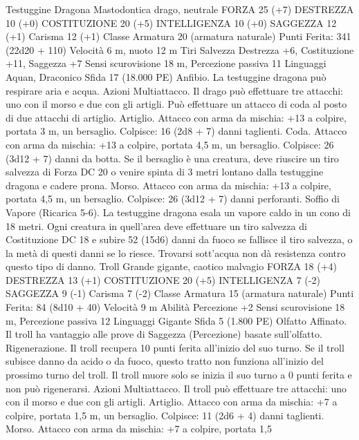 \begin{multicols}{2}
Testuggine Dragona
Mastodontica drago, neutrale
FORZA 25 (+7)
DESTREZZA 10 (+0)
COSTITUZIONE 20 (+5)
INTELLIGENZA 10 (+0)
SAGGEZZA 12 (+1)
Carisma 12 (+1)
Classe Armatura 20 (armatura naturale)
\hspace*{0pt}\hfill{Punti Ferita}: 341 (22d20 + 110)
Velocità 6 m, nuoto 12 m
Tiri Salvezza Destrezza +6, Costituzione +11, Saggezza +7
Sensi scurovisione 18 m, Percezione passiva 11
Linguaggi Aquan, Draconico
Sfida 17 (18.000 PE)
Anfibio. La testuggine dragona può respirare aria e acqua.
Azioni
Multiattacco. Il drago può effettuare tre attacchi: uno con il
morso e due con gli artigli. Può effettuare un attacco di coda al
posto di due attacchi di artiglio.
Artiglio. Attacco con arma da mischia: +13 a colpire, portata 3
m, un bersaglio.
Colpisce: 16 (2d8 + 7) danni taglienti.
Coda. Attacco con arma da mischia: +13 a colpire, portata 4,5
m, un bersaglio.
Colpisce: 26 (3d12 + 7) danni da botta. Se il bersaglio è una
creatura, deve riuscire un tiro salvezza di Forza DC 20 o venire
spinta di 3 metri lontano dalla testuggine dragona e cadere prona.
Morso. Attacco con arma da mischia: +13 a colpire, portata 4,5
m, un bersaglio.
Colpisce: 26 (3d12 + 7) danni perforanti.
Soffio di Vapore (Ricarica 5-6). La testuggine dragona esala un
vapore caldo in un cono di 18 metri. Ogni creatura in quell’area
deve effettuare un tiro salvezza di Costituzione DC 18 e subire
52 (15d6) danni da fuoco se fallisce il tiro salvezza, o la metà di
questi danni se lo riesce. Trovarsi sott’acqua non dà resistenza
contro questo tipo di danno.
Troll
Grande gigante, caotico malvagio
FORZA 18 (+4)
DESTREZZA 13 (+1)
COSTITUZIONE 20 (+5)
INTELLIGENZA 7 (-2)
SAGGEZZA 9 (-1)
Carisma 7 (-2)
Classe Armatura 15 (armatura naturale)
\hspace*{0pt}\hfill{Punti Ferita}: 84 (8d10 + 40)
Velocità 9 m
Abilità Percezione +2
Sensi scurovisione 18 m, Percezione passiva 12
Linguaggi Gigante
Sfida 5 (1.800 PE)
Olfatto Affinato. Il troll ha vantaggio alle prove di Saggezza
(Percezione) basate sull’olfatto.
Rigenerazione. Il troll recupera 10 punti ferita all’inizio del suo
turno. Se il troll subisce danno da acido o da fuoco, questo tratto
non funziona all’inizio del prossimo turno del troll. Il troll muore
solo se inizia il suo turno a 0 punti ferita e non può rigenerarsi.
Azioni
Multiattacco. Il troll può effettuare tre attacchi: uno con il morso
e due con gli artigli.
Artiglio. Attacco con arma da mischia: +7 a colpire, portata 1,5
m, un bersaglio.
Colpisce: 11 (2d6 + 4) danni taglienti.
Morso. Attacco con arma da mischia: +7 a colpire, portata 1,5

\end{multicols}
